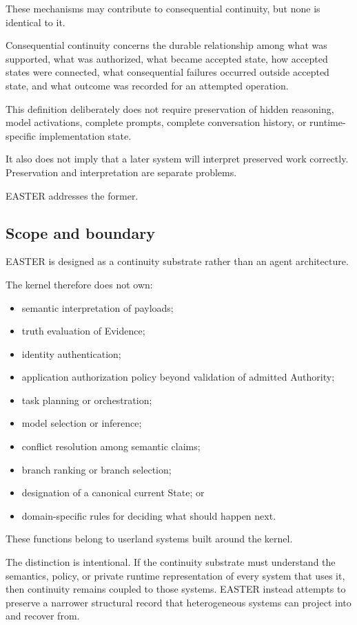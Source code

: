 \documentclass[11pt]{article}
\begin{document}
These mechanisms may contribute to consequential continuity, but none is identical to it.

Consequential continuity concerns the durable relationship among what was supported, what was authorized, what became accepted state, how accepted states were connected, what consequential failures occurred outside accepted state, and what outcome was recorded for an attempted operation.

This definition deliberately does not require preservation of hidden reasoning, model activations, complete prompts, complete conversation history, or runtime-specific implementation state.

It also does not imply that a later system will interpret preserved work correctly. Preservation and interpretation are separate problems.

EASTER addresses the former.

\subsection{Scope and boundary}

EASTER is designed as a continuity substrate rather than an agent architecture.

The kernel therefore does not own:

\begin{itemize}
\item semantic interpretation of payloads;
\item truth evaluation of Evidence;
\item identity authentication;
\item application authorization policy beyond validation of admitted Authority;
\item task planning or orchestration;
\item model selection or inference;
\item conflict resolution among semantic claims;
\item branch ranking or branch selection;
\item designation of a canonical current State; or
\item domain-specific rules for deciding what should happen next.
\end{itemize}

These functions belong to userland systems built around the kernel.

The distinction is intentional. If the continuity substrate must understand the semantics, policy, or private runtime representation of every system that uses it, then continuity remains coupled to those systems. EASTER instead attempts to preserve a narrower structural record that heterogeneous systems can project into and recover from.
\end{document}
